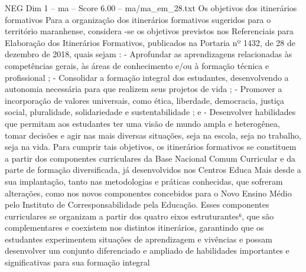 \begin{textsample}{NEG Dim 1 – ma – Score 6.00 – ma/ma\_em\_28.txt}  \label{ex:f1_neg_227}
Os objetivos dos itinerários formativos Para a organização dos itinerários formativos sugeridos para o território maranhense, considera -se os objetivos previstos nos Referenciais para Elaboração dos Itinerários Formativos, publicados na Portaria nº 1432, de 28 de dezembro de 2018, quais sejam : - Aprofundar as aprendizagens relacionadas às competências gerais, às áreas de conhecimento e/ou à formação técnica e profissional ; - Consolidar a formação integral dos estudantes, desenvolvendo a autonomia necessária para que realizem seus projetos de vida ; - Promover a incorporação de valores universais, como ética, liberdade, democracia, justiça social, pluralidade, solidariedade e sustentabilidade ; e - Desenvolver habilidades que permitam aos estudantes ter uma visão de mundo ampla e heterogênea, tomar decisões e agir nas mais diversas situações, seja na escola, seja no trabalho, seja na vida.
Para cumprir tais objetivos, os itinerários formativos se constituem a partir dos componentes curriculares da Base Nacional Comum Curricular e da parte de formação diversificada, já desenvolvidos nos Centros Educa Mais desde a sua implantação, tanto nas metodologias e práticas conhecidas, que sofreram alterações, como nos novos componentes concebidos para o Novo Ensino Médio pelo Instituto de Corresponsabilidade pela Educação.
Esses componentes curriculares se organizam a partir dos quatro eixos estruturantes⁶, que são complementares e coexistem nos distintos itinerários, garantindo que os estudantes experimentem situações de aprendizagem e vivências e possam desenvolver um conjunto diferenciado e ampliado de habilidades importantes e significativas para sua formação integral

\end{textsample}

